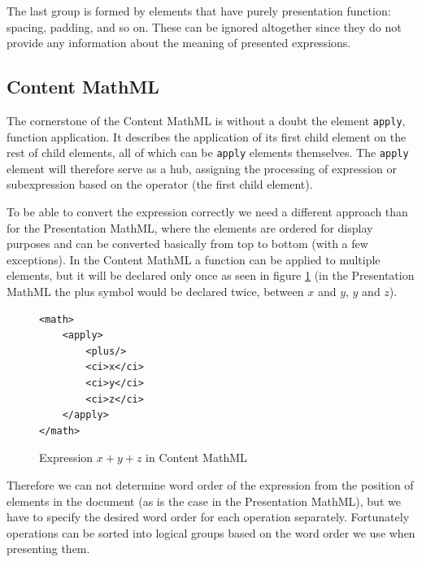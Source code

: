 \documentclass[11pt,oneside,final]{fithesis2}
\begin{document}
The last group is formed by elements that have purely presentation function: spacing, padding, and so on. These can be ignored altogether since they do not provide any information about the meaning of presented expressions.


\subsection{Content MathML}
\label{analysis-content}
The cornerstone of the Content MathML is without a doubt the element \texttt{apply}, function application. It describes the application of its first child element on the rest of child elements, all of which can be \texttt{apply} elements themselves. The \texttt{apply} element will therefore serve as a hub, assigning the processing of expression or subexpression based on the operator (the first child element).

To be able to convert the expression correctly we need a different approach than for the Presentation MathML, where the elements are ordered for display purposes and can be converted basically from top to bottom (with a few exceptions). In the Content MathML a function can be applied to multiple elements, but it will be declared only once as seen in figure \ref{fig:mathplus} (in the Presentation MathML the plus symbol would be declared twice, between $x$ and $y$, $y$ and $z$).

\begin{figure}[!ht]
\lstset{language=XML,frame=lines}
\begin{lstlisting}
<math>
	<apply>
		<plus/>
		<ci>x</ci>
		<ci>y</ci>
		<ci>z</ci>
	</apply>
</math>
\end{lstlisting}
\caption{Expression $x+y+z$ in Content MathML}
\label{fig:mathplus}
\end{figure}

Therefore we can not determine word order of the expression from the position of elements in the document (as is the case in the Presentation MathML), but we have to specify the desired word order for each operation separately. Fortunately operations can be sorted into logical groups based on the word order we use when presenting them.
\end{document}
